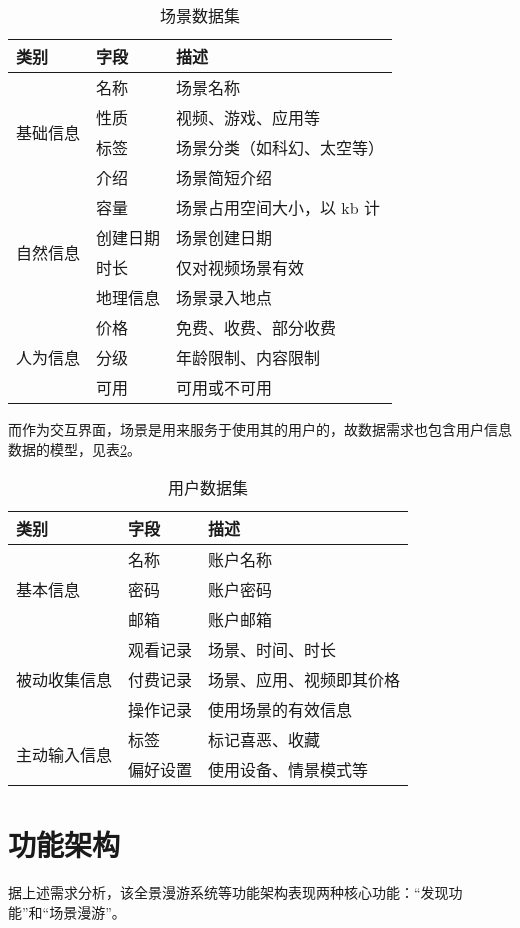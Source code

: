 \begin{table}[htp]
\centering
\caption{场景数据集}
\vskip 5pt
\begin{tabular}{lll}
\toprule
类别 & 字段 & 描述 \\
\midrule
\multirow{4}{*}{基础信息}& 名称 & 场景名称 \\
& 性质 & 视频、游戏、应用等 \\
& 标签 & 场景分类（如科幻、太空等） \\
& 介绍 & 场景简短介绍 \\
\midrule
\multirow{4}{*}{自然信息}& 容量 & 场景占用空间大小，以 kb 计 \\
& 创建日期 & 场景创建日期 \\
& 时长 & 仅对视频场景有效 \\
& 地理信息 & 场景录入地点 \\
\midrule
\multirow{3}{*}{人为信息}& 价格 & 免费、收费、部分收费 \\
& 分级 & 年龄限制、内容限制 \\
& 可用 & 可用或不可用 \\
\bottomrule
\end{tabular}
\label{tab:data}
\end{table}

而作为交互界面，场景是用来服务于使用其的用户的，故数据需求也包含用户信息数据的模型，见表\ref{tab:user}。

\begin{table}[htp]
\centering
\caption{用户数据集}
\vskip 5pt
\begin{tabular}{lll}
\toprule
类别 & 字段 & 描述 \\
\midrule
\multirow{3}{*}{基本信息} & 名称 & 账户名称 \\
& 密码 & 账户密码 \\
& 邮箱 & 账户邮箱 \\
\midrule
\multirow{3}{*}{被动收集信息} & 观看记录 & 场景、时间、时长 \\
& 付费记录 & 场景、应用、视频即其价格 \\
& 操作记录 & 使用场景的有效信息 \\
\midrule
\multirow{3}{*}{主动输入信息} & 标签 & 标记喜恶、收藏 \\
& 偏好设置 & 使用设备、情景模式等 \\
\bottomrule
\end{tabular}
\label{tab:user}
\end{table}

\section{功能架构}
据上述需求分析，该全景漫游系统等功能架构表现两种核心功能：“发现功能”和“场景漫游”。


